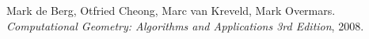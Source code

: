 \documentclass[a4paper, 8pt, oneside]{article}
\begin{document}
\medskip
 
\begin{thebibliography}{9}
Mark de Berg, Otfried Cheong, Marc van Kreveld, Mark Overmars.
\textit{Computational Geometry: Algorithms and Applications 3rd Edition}, 2008.
\end{thebibliography}
\end{document}
